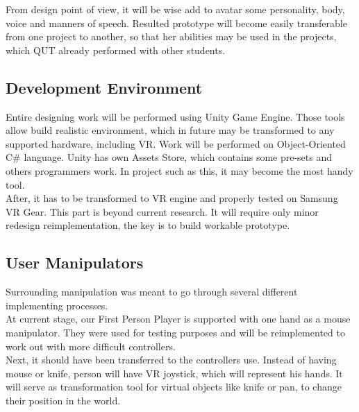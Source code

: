 \documentclass[18pt]{article}
\numberwithin{equation}{section} %
\numberwithin{figure}{section} %
\numberwithin{table}{section} %
\begin{document}
	From design point of view, it will be wise add to avatar some personality, body, voice and manners of speech. Resulted prototype will become easily transferable from one project to another, so that her abilities may be used in the projects, which QUT already performed with other students. \\
	
	\subsection{Development Environment}
		Entire designing work will be performed using Unity Game Engine. Those tools allow build realistic environment, which in future may be transformed to any supported hardware, including VR. Work will be performed on Object-Oriented C\# language. Unity has own Assets Store, which contains some pre-sets and others programmers work. In project such as this, it may become the most handy tool. \\
		
		After, it has to be transformed to VR engine and properly tested on Samsung VR Gear. This part is beyond current research. It will require only minor redesign reimplementation, the key is to build workable prototype. \\
	
	\subsection{User Manipulators}
		Surrounding manipulation was meant to go through several different implementing processes. \\	
		At current stage, our First Person Player is supported with one hand as a mouse manipulator. They were used for testing purposes and will be reimplemented to work out with more difficult controllers. \\
		
		Next, it should have been transferred to the controllers use. Instead of having mouse or knife, person will have VR joystick, which will represent his hands. It will serve as transformation tool for virtual objects like knife or pan, to change their position in the world. \\
	
	
	
\end{document}

